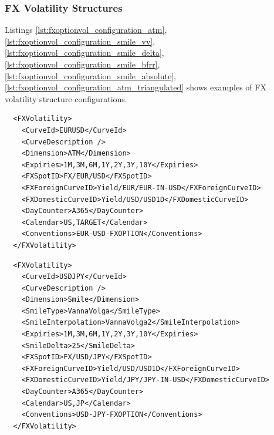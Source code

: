 

\subsubsection{FX Volatility Structures}

Listings \ref{lst:fxoptionvol_configuration_atm}, \ref{lst:fxoptionvol_configuration_smile_vv},
\ref{lst:fxoptionvol_configuration_smile_delta}, \ref{lst:fxoptionvol_configuration_smile_bfrr}, \ref{lst:fxoptionvol_configuration_smile_absolute},
\ref{lst:fxoptionvol_configuration_atm_triangulated} shows examples of FX volatility structure configurations.

\begin{longlisting}
\begin{verbatim}
  <FXVolatility>
    <CurveId>EURUSD</CurveId>
    <CurveDescription />
    <Dimension>ATM</Dimension>
    <Expiries>1M,3M,6M,1Y,2Y,3Y,10Y</Expiries>
    <FXSpotID>FX/EUR/USD</FXSpotID>
    <FXForeignCurveID>Yield/EUR/EUR-IN-USD</FXForeignCurveID>
    <FXDomesticCurveID>Yield/USD/USD1D</FXDomesticCurveID>
    <DayCounter>A365</DayCounter>
    <Calendar>US,TARGET</Calendar>
    <Conventions>EUR-USD-FXOPTION</Conventions>
  </FXVolatility>
\end{verbatim}
\caption{FX option volatility configuration ATM}
\label{lst:fxoptionvol_configuration_atm}
\end{longlisting}

\begin{longlisting}
\begin{verbatim}
  <FXVolatility>
    <CurveId>USDJPY</CurveId>
    <CurveDescription />
    <Dimension>Smile</Dimension>
    <SmileType>VannaVolga</SmileType>
    <SmileInterpolation>VannaVolga2</SmileInterpolation>
    <Expiries>1M,3M,6M,1Y,2Y,3Y,10Y</Expiries>
    <SmileDelta>25</SmileDelta>
    <FXSpotID>FX/USD/JPY</FXSpotID>
    <FXForeignCurveID>Yield/USD/USD1D</FXForeignCurveID>
    <FXDomesticCurveID>Yield/JPY/JPY-IN-USD</FXDomesticCurveID>
    <DayCounter>A365</DayCounter>
    <Calendar>US,JP</Calendar>
    <Conventions>USD-JPY-FXOPTION</Conventions>
  </FXVolatility>
\end{verbatim}
\caption{FX option volatility configuration Smile / VannaVolga}
\label{lst:fxoptionvol_configuration_smile_vv}
\end{longlisting}

